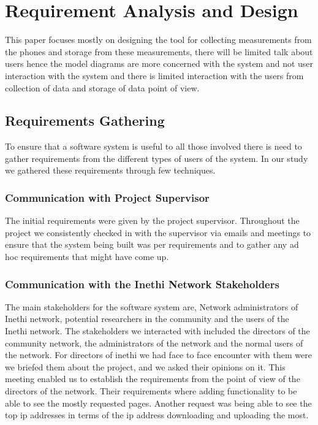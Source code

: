 \section{Requirement Analysis and Design}\label{sec:design-decision}
This paper focuses mostly on designing the tool for collecting measurements from the phones and storage from these measurements, there will be limited talk about users hence the model diagrams are more concerned with the system and not user interaction with the system and there is limited interaction with the users from collection of data and storage of data point of view.
\subsection{Requirements Gathering}\label{subsec:requirements-gathering}
To ensure that a software system is useful to all those involved there is need to gather requirements from the different types of users of the system.
In our study we gathered these requirements through few techniques.
\subsubsection{Communication with Project Supervisor}
The initial requirements were given by the project supervisor.
Throughout the project we consistently checked in with the supervisor via emails and meetings to ensure that the system being built was per requirements and to gather any ad hoc requirements that might have come up.
\subsubsection{Communication with the Inethi Network Stakeholders}
The main stakeholders for the software system are, Network administrators of Inethi network, potential researchers in the community and the users of the Inethi network.
The stakeholders we interacted with included the directors of the community network, the administrators of the network and the normal users of the network.
For directors of inethi we had face to face encounter with them were we briefed them about the project, and we asked their opinions on it.
This meeting enabled us to establish the requirements from the point of view of the directors of the network.
Their requirements where adding functionality to be able to see the mostly requested pages.
Another request was being able to see the top ip addresses in terms of the ip address downloading and uploading the most.
